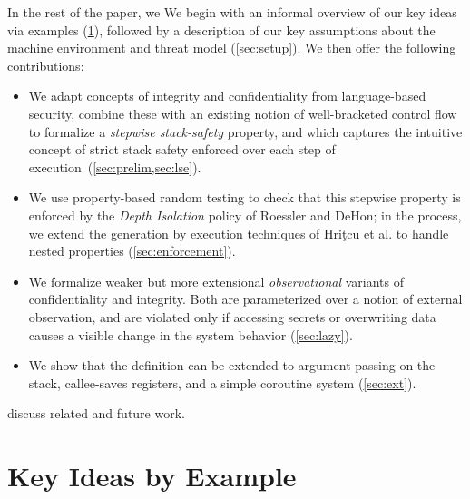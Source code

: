 \documentclass[10pt,conference]{ieeetran}%
\theoremstyle{definition}
\begin{document}
\ifspace
In the rest of the paper, we
\else
We
\fi
begin with an informal overview of our key ideas via
examples (\cref{sec:running-example}), followed by a description of our key
assumptions about the machine environment and threat model (\cref{sec:setup}).
We then offer the following contributions:

\begin{itemize}
\item We adapt concepts of integrity and confidentiality from language-based
security, combine these with an existing notion of well-bracketed
control flow to formalize a {\em stepwise stack-safety}
property, and which captures the intuitive concept of
strict stack safety enforced over each step of execution~(\cref{sec:prelim,sec:lse}).
\item We use property-based random testing to check that this stepwise
property is  enforced by the {\em Depth Isolation} policy
of Roessler and DeHon\cite{DBLP:conf/sp/RoesslerD18}; in the process, we extend the generation by
execution techniques of Hri\c{t}cu et al.\cite{TestingNI:ICFP} to handle nested
properties (\cref{sec:enforcement}).
\item We formalize weaker but more extensional \emph{observational} variants of
  confidentiality and integrity. Both are parameterized over a notion of external
  observation, and are violated only if accessing secrets or overwriting
  data causes a visible change in the system behavior (\cref{sec:lazy}).
\item We show that the definition can be
extended to argument passing on the stack, callee-saves registers, and a simple coroutine system (\cref{sec:ext}).
\end{itemize}
 discuss related and future work.

\section{Key Ideas by Example}
\label{sec:running-example}

\newcommand{\mainsealc}{cyan}
\newcommand{\fsealc}{green}
\newcommand{\unsealc}{lgray}
\newcommand{\emptyoutc}{white} %
\newcommand{\fulloutc}{white}
\newcommand{\badc}{lred}
\newcommand{\goodc}{lblue}
\newcommand{\retptrc}{black}
\newcommand{\sealdesc}[1]{Seal(#1)}
\newcommand{\unsealdesc}{Unseal}
\newcommand{\retptrdesc}{RetPtr}
\newcommand{\passdesc}[2]{Pass(#1,#2)}
\end{document}
